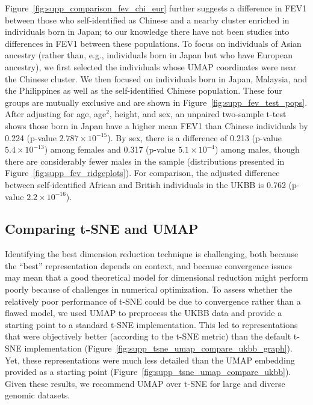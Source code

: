 Figure~\ref{fig:supp_comparison_fev_chi_eur} further suggests a difference in FEV1 between those who self-identified as Chinese and a nearby cluster enriched in individuals born in Japan; to our knowledge there have not been studies into differences in FEV1 between these populations. To focus on individuals of Asian ancestry (rather than, e.g., individuals born in Japan but who have European ancestry), we first selected the individuals whose UMAP coordinates were near the Chinese cluster. We then focused on individuals born in Japan, Malaysia, and the Philippines as well as the self-identified Chinese population. These four groups are mutually exclusive and are shown in Figure~\ref{fig:supp_fev_test_pops}. After adjusting for age, age$^2$, height, and sex, an unpaired two-sample t-test shows those born in Japan have a higher mean FEV1 than Chinese individuals by 0.224 (p-value $2.787\times 10^{-15}$). By sex, there is a difference of 0.213 (p-value $5.4\times 10^{-13}$) among females and 0.317 (p-value $5.1\times 10^{-4}$) among males, though there are considerably fewer males in the sample (distributions presented in Figure~\ref{fig:supp_fev_ridgeplots}). For comparison, the adjusted difference between self-identified African and British individuals in the UKBB is 0.762 (p-value $2.2\times 10^{-16}$).

\subsection{Comparing t-SNE and UMAP}
Identifying the best dimension reduction technique is challenging, both because the ``best'' representation depends on context, and because convergence issues may mean that a good theoretical model for dimensional reduction might perform poorly because of challenges in numerical optimization. To assess whether the relatively poor performance of t-SNE could be due to convergence rather than a flawed model, we used UMAP to preprocess the UKBB data and provide a starting point to a standard t-SNE implementation. This led to representations that were objectively better (according to the t-SNE metric) than the default t-SNE implementation (Figure~\ref{fig:supp_tsne_umap_compare_ukbb_graph}). Yet, these representations were much less detailed than the UMAP embedding provided as a starting point (Figure~\ref{fig:supp_tsne_umap_compare_ukbb}).  Given these results, we recommend UMAP over t-SNE for large and diverse genomic datasets.

